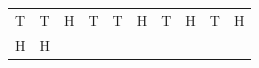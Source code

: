{\begin{tabular}[t]{|l|l|l|l|l|l|l|l|l|l|}
        T &
        T &
        H &
        T &
        T &
        H &
        T &
        H &
        T &
        H%
     \tabularnewline\cline{1-1}\cline{2-2}\cline{3-3}\cline{4-4}\cline{5-5}\cline{6-6}\cline{7-7}\cline{8-8}\cline{9-9}\cline{10-10}
        H &
        H &

\end{tabular}}
